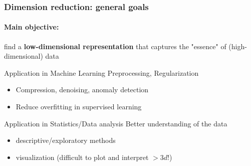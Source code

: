 \documentclass{beamer}\usepackage[]{graphicx}\usepackage[]{color}
\begin{document}
\begin{frame}[label=DimensionReduction]
  \frametitle{Dimension reduction: general goals}

  \paragraph{Main objective:} find a \alert{\bf low-dimensional representation} that captures the "essence" of (high-dimensional) data

  \vfill

  \begin{block}{Application in Machine Learning}
  \alert{Preprocessing, Regularization}
  \begin{itemize}
    \item Compression, denoising,  anomaly detection
    \item Reduce overfitting in supervised learning
  \end{itemize}
  \end{block}

\vfill

  \begin{block}{Application in Statistics/Data analysis}
    \alert{Better understanding of the data}
    \begin{itemize}
      \item descriptive/exploratory methods
      \item visualization (difficult to plot and interpret $> 3d$!)
    \end{itemize}
  \end{block}

\end{frame}
\end{document}

